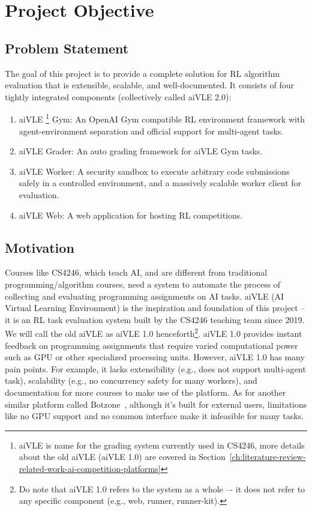 \chapter{Project Objective}
\section{Problem Statement}
The goal of this project is to provide a complete solution for RL algorithm evaluation that is extensible, scalable, and well-documented. It consists of four tightly integrated components (collectively called aiVLE 2.0):

\begin{enumerate}
    \item aiVLE \footnote{aiVLE is name for the grading system currently used in CS4246, more details about the old aiVLE (aiVLE 1.0) are covered in Section~\ref{ch:literature-review-related-work-ai-competition-platforms}} Gym: An OpenAI Gym \cite{openai-gym} compatible RL environment framework with agent-environment separation and official support for multi-agent tasks.
    \item aiVLE Grader: An auto grading framework for aiVLE Gym tasks.
    \item aiVLE Worker: A security sandbox to execute arbitrary code submissions safely in a controlled environment, and a massively scalable worker client for evaluation.
    \item aiVLE Web: A web application for hosting RL competitions.
\end{enumerate}

\section{Motivation}
Courses like CS4246, which teach AI, and are different from traditional programming/algorithm courses, need a system to automate the process of collecting and evaluating programming assignments on AI tasks. aiVLE (AI Virtual Learning Environment) is the inspiration and foundation of this project – it is an RL task evaluation system built by the CS4246 teaching team since 2019. We will call the old aiVLE as aiVLE 1.0 henceforth\footnote{Do note that aiVLE 1.0 refers to the system as a whole –- it does not refer to any specific component (e.g., web, runner, runner-kit).}. aiVLE 1.0 provides instant feedback on programming assignments that require varied computational power such as GPU or other specialized processing units. However, aiVLE 1.0 has many pain points. For example, it lacks extensibility (e.g., does not support multi-agent task), scalability (e.g., no concurrency safety for many workers), and documentation for more courses to make use of the platform. As for another similar platform called Botzone~\cite{botzone}, although it’s built for external users, limitations like no GPU support and no common interface make it infeasible for many tasks.


